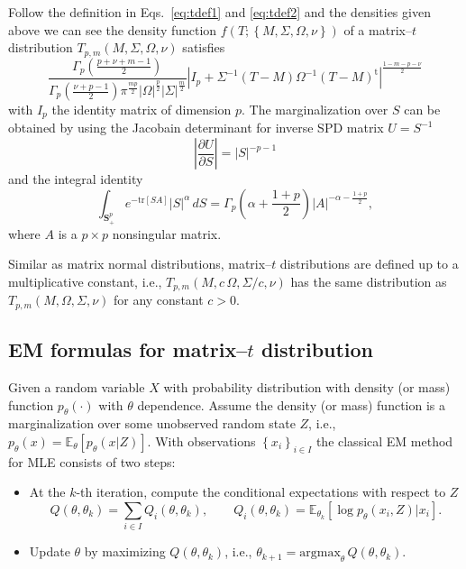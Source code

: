 \documentclass[english,listof=totoc]{scrartcl}
\begin{document}
Follow the definition in Eqs.~\eqref{eq:tdef1} and \eqref{eq:tdef2} and the densities given above we can see the density function $f(T;\left\{M,\Sigma,\Omega,\nu\right\})$ of a matrix--$t$ distribution $T_{p,m}(M,\Sigma,\Omega,\nu)$ satisfies
\begin{equation}
\frac{\Gamma_{p}\left(\frac{p+\nu+m-1}{2}\right)}{\Gamma_{p}\left(\frac{\nu+p-1}{2}\right)\pi^{\frac{mp}{2}}|\Omega|^{\frac{p}{2}}|\Sigma|^{\frac{m}{2}}}
|I_p+\Sigma^{-1}(T-M)\Omega^{-1}(T-M)^{\textrm{t}}|^{\frac{1-m-p-\nu}{2}}
\label{eq:matrixtpdf}
\end{equation}
with $I_p$ the identity matrix of dimension $p$. The marginalization over $S$ can be obtained by using the Jacobain determinant for inverse SPD matrix $U=S^{-1}$
\begin{equation}
\left|\frac{\partial U}{\partial S}\right|=|S|^{-p-1}
\end{equation}
and the integral identity \citep{gupta1999matrix}
\begin{equation}
\int_{\mathbf{S}_+^p}e^{-\textrm{tr}[S A]}|S|^{\alpha}\,dS=\Gamma_{p}\left(\alpha+\frac{1+p}{2}\right)|A|^{-\alpha-\frac{1+p}{2}},\label{eq:intmultgammadef}
\end{equation}
where $A$ is a $p\times p$ nonsingular matrix.

Similar as matrix normal distributions, matrix--$t$ distributions are defined up to a multiplicative constant, i.e., $T_{p,m}(M,c\,\Omega,\Sigma/c,\nu)$ has the same distribution as $T_{p,m}(M,\Omega,\Sigma,\nu)$ for any constant $c>0$.

\subsection{EM formulas for matrix--$t$ distribution}

Given a random variable $X$ with probability distribution with density (or mass) function $p_{\theta}(\cdot)$ with $\theta$ dependence. Assume the density (or mass) function is a marginalization over some unobserved random state $Z$, i.e., $p_{\theta}(x)=\mathbb{E}_{\theta}\left[p_{\theta}(x|Z)\right]$. With observations $\left\{x_i\right\}_{i\in I}$ the classical EM method for MLE consists of two steps:

\begin{itemize}
\item At the $k$-th iteration, compute the conditional expectations with respect to $Z$
\begin{equation}
Q(\theta,\theta_k)=\sum_{i\in I}Q_i(\theta,\theta_k),\qquad Q_i(\theta,\theta_k)=\mathbb{E}_{\theta_k}\left[\log p_{\theta}(x_i,Z)|x_i\right].
\end{equation}

\item Update $\theta$ by maximizing $Q(\theta,\theta_k)$, i.e., $\theta_{k+1} = \textrm{argmax}_{\theta}\,Q(\theta,\theta_k)$.
\end{itemize}
\end{document}
